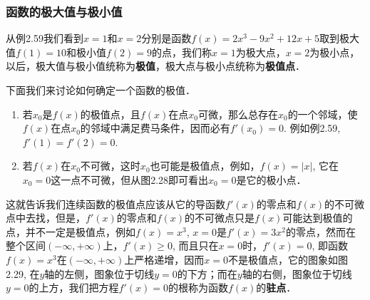 \subsubsection{函数的极大值与极小值}

从例2.59我们看到$x=1$和$x=2$分别是函数$f(x)=2x^3-9x^2+12x+5$取到极大值$f(1)=10$和极小值$f(2)=9$的点，我们称$x=1$为极大点，$x=2$为极小点，以后，极大值与极小值统称为\textbf{极值}，极大点与极小点统称为\textbf{极值点}．

下面我们来讨论如何确定一个函数的极值．
\begin{enumerate}
    \item 若$x_0$是$f(x)$的极值点，且$f(x)$在点$x_0$可微，那么总存在$x_0$的一个邻域，使$f(x)$在点$x_0$的邻域中满足费马条件，因而必有$f'(x_0)=0$. 例如例2.59, $f'(1)=f' (2) =0$.
    \item 若$f(x)$在$x_0$不可微，这时$x_0$也可能是极值点，例如，$f(x)=|x|$, 它在$x_0=0$这一点不可微，但从图2.28即可看出$x_0=0$是它的极小点．
\end{enumerate}

\begin{figure}[htp]
    \centering
    \begin{minipage}[t]{0.48\textwidth}
    \centering
{}
    \caption{}
    \end{minipage}
    \begin{minipage}[t]{0.48\textwidth}
    \centering
    \caption{}
    \end{minipage}
    \end{figure}


这就告诉我们连续函数的极值点应该从它的导函数$f'(x)$的零点和$f(x)$的不可微点中去找，但是，$f'(x)$的零点和$f(x)$的不可微点只是$f(x)$可能达到极值的点，并不一定是极值点，例如$f(x)=x^3$, $x=0$是$f'(x)=3x^2$的零点，然而在整个区间$(-\infty,+\infty)$上，$f'(x)\ge 0$, 而且只在$x=0$时，$f'(x)=0$, 即函数$f(x)=x^3$在$(-\infty,+\infty)$上严格递增，因而$x=0$不是极值点，它的图象如图2.29, 在$y$轴的左侧，图象位于切线$y=0$的下方；而在$y$轴的右侧，图象位于切线$y=0$的上方，我们把方程$f'(x)=0$的根称为函数$f(x)$的\textbf{驻点}．


